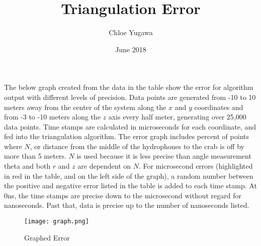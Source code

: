 \documentclass{article}
\title{Triangulation Error}
\author{Chloe Yugawa}
\date{June 2018}
\begin{document}
\maketitle
The below graph created from the data in the table show the error for algorithm output with different levels of precision. Data points are generated from -10 to 10 meters away from the center of the system along the $x$ and $y$ coordinates and from -3 to -10 meters along the $z$ axis every half meter, generating over 25,000 data points. Time stamps are calculated in microseconds for each coordinate, and fed into the triangulation algorithm. The error graph includes percent of points where $N$, or distance from the middle of the hydrophones to the crab is off by more than 5 meters. $N$ is used because it is less precise than angle measurement theta and both $r$ and $z$ are dependent on $N$. For microsecond errors (highlighted in red in the table, and on the left side of the graph), a random number between the positive and negative error listed in the table is added to each time stamp. At 0ns, the time stamps are precise down to the microsecond without regard for nanoseconds. Past that, data is precise up to the number of nanoseconds listed.\\
\begin{minipage}[t]{0.5\textwidth}
    \begin{figure}[H]
    \centering
        \texttt{[image: graph.png]}
        \caption{Graphed Error}
        \label{fig:my_label}
    \end{figure}
\end{minipage}
\end{document}
